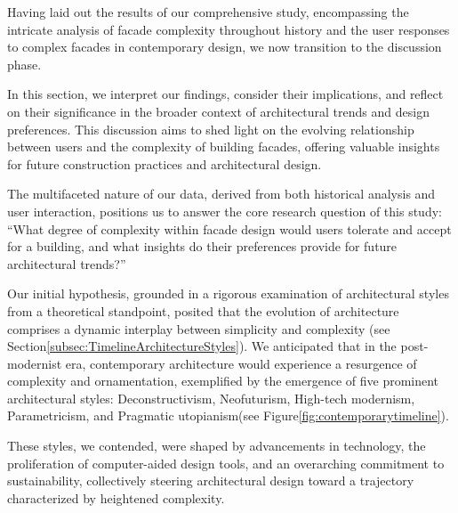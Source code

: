 


Having laid out the results of our comprehensive study, encompassing the intricate analysis of facade complexity throughout history and the user responses to complex facades in contemporary design, we now transition to the discussion phase.

In this section, we interpret our findings, consider their implications, and reflect on their significance in the broader context of architectural trends and design preferences.
This discussion aims to shed light on the evolving relationship between users and the complexity of building facades, offering valuable insights for future construction practices and architectural design.

The multifaceted nature of our data, derived from both historical analysis and user interaction, positions us to answer the core research question of this study: ``What degree of complexity within facade design would users tolerate and accept for a building, and what insights do their preferences provide for future architectural trends?''



Our initial hypothesis, grounded in a rigorous examination of architectural styles from a theoretical standpoint, posited that the evolution of architecture comprises a dynamic interplay between simplicity and complexity (see Section\ref{subsec:TimelineArchitectureStyles}).
We anticipated that in the post-modernist era, contemporary architecture would experience a resurgence of complexity and ornamentation, exemplified by the emergence of five prominent architectural styles: Deconstructivism, Neofuturism, High-tech modernism, Parametricism, and Pragmatic utopianism(see Figure\ref{fig:contemporarytimeline}).

These styles, we contended, were shaped by advancements in technology, the proliferation of computer-aided design tools, and an overarching commitment to sustainability, collectively steering architectural design toward a trajectory characterized by heightened complexity.

